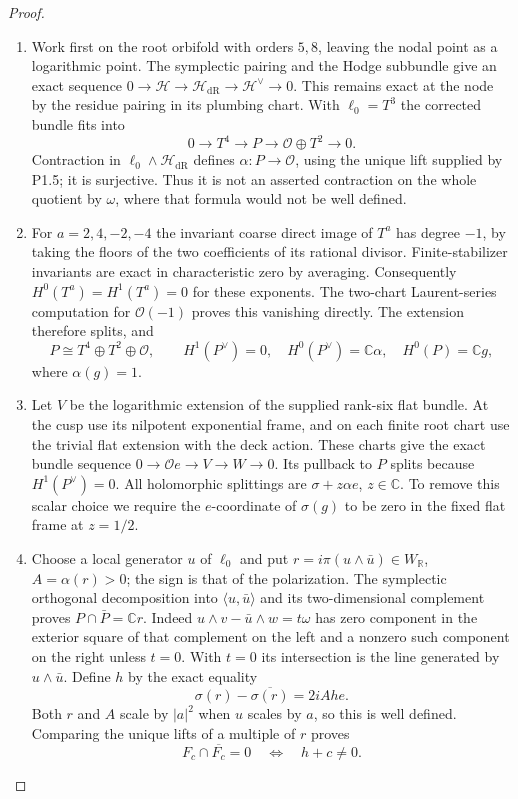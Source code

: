 \begin{proof}
\begin{enumerate}[label=\arabic*.]
\item Work first on the root orbifold with orders $5,8$, leaving the nodal
point as a logarithmic point.  The symplectic pairing and the Hodge
subbundle give an exact sequence
$0\to\mathcal H\to\mathcal H_{\mathrm{dR}}\to\mathcal H^\vee\to0$.
This remains exact at the node by the residue pairing in its plumbing
chart.  With $\ell_0=T^3$ the corrected bundle fits into
\[
0\longrightarrow T^4\longrightarrow P
 \longrightarrow\mathcal O\oplus T^2\longrightarrow0.
\]
Contraction in $\ell_0\wedge\mathcal H_{\mathrm{dR}}$ defines
$\alpha:P\to\mathcal O$, using the unique lift supplied by P1.5;
it is surjective.  Thus it is not an asserted contraction on the whole
quotient by $\omega$, where that formula would not be well defined.

\item For $a=2,4,-2,-4$ the invariant coarse direct image of $T^a$ has degree
$-1$, by taking the floors of the two coefficients of its rational
divisor.  Finite-stabilizer invariants are exact in characteristic zero
by averaging.  Consequently $H^0(T^a)=H^1(T^a)=0$ for these exponents.
The two-chart Laurent-series computation for $\mathcal O(-1)$ proves
this vanishing directly.  The extension therefore splits, and
\[
P\cong T^4\oplus T^2\oplus\mathcal O,\qquad
H^1(P^\vee)=0,\quad H^0(P^\vee)=\mathbb C\alpha,
\quad H^0(P)=\mathbb Cg,
\]
where $\alpha(g)=1$.

\item Let $V$ be the logarithmic extension of the supplied rank-six flat
bundle.  At the cusp use its nilpotent exponential frame, and on each
finite root chart use the trivial flat extension with the deck action.
These charts give the exact bundle sequence
$0\to\mathcal Oe\to V\to W\to0$.
Its pullback to $P$ splits because $H^1(P^\vee)=0$.
All holomorphic splittings are $\sigma+z\alpha e$, $z\in\mathbb C$.
To remove this scalar choice we require the $e$-coordinate of
$\sigma(g)$ to be zero in the fixed flat frame at $z=1/2$.

\item Choose a local generator $u$ of $\ell_0$ and put
$r=i\pi(u\wedge\bar u)\in W_{\mathbb R}$, $A=\alpha(r)>0$;
the sign is that of the polarization.  The symplectic orthogonal
decomposition into $\langle u,\bar u\rangle$ and its two-dimensional
complement proves $P\cap\bar P=\mathbb Cr$.
Indeed $u\wedge v-\bar u\wedge w=t\omega$ has zero component in the
exterior square of that complement on the left and a nonzero such
component on the right unless $t=0$.  With $t=0$ its intersection is
the line generated by $u\wedge\bar u$.
Define $h$ by the exact equality
\[
\sigma(r)-\overline{\sigma(r)}=2iAh e.
\]
Both $r$ and $A$ scale by $|a|^2$ when $u$ scales by $a$, so this is
well defined.  Comparing the unique lifts of a multiple of $r$ proves
\[
F_c\cap\overline{F_c}=0\quad\Longleftrightarrow\quad h+c\ne0.
\]


\end{enumerate}
\end{proof}
